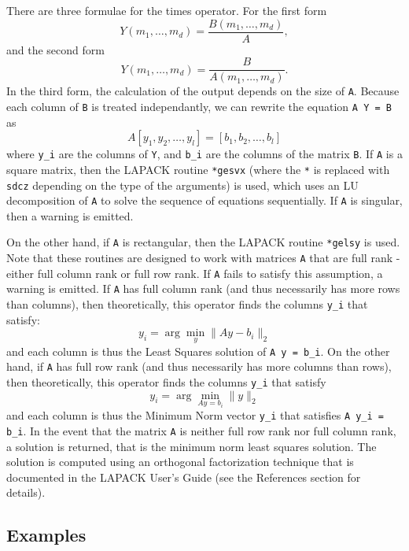 There are three formulae for the times operator.  For the first form
\[
Y(m_1,\ldots,m_d) = \frac{B(m_1,\ldots,m_d)}{A},
\]
and the second form
\[
Y(m_1,\ldots,m_d) = \frac{B}{A(m_1,\ldots,m_d)}.
\]
In the third form, the calculation of the output depends on the size of \verb|A|. Because each column of \verb|B| is treated independantly, we can rewrite the equation \verb|A Y = B| as
\[
  A [y_1, y_2,\ldots, y_l] = [b_1, b_2, \ldots, b_l]
\]
where \verb|y_i| are the columns of \verb|Y|, and \verb|b_i| are the columns of the matrix \verb|B|. If \verb|A| is a square matrix, then the LAPACK routine \verb|*gesvx| (where the \verb|*| is replaced with \verb|sdcz| depending on the type of the arguments) is used, which uses an LU decomposition of \verb|A| to solve the sequence of equations sequentially.  If \verb|A| is singular, then a warning is emitted. 

On the other hand, if \verb|A| is rectangular, then the LAPACK routine \verb|*gelsy| is used.  Note that these routines are designed to work with matrices \verb|A| that are full rank - either full column rank or full row rank.  If \verb|A| fails to satisfy this assumption, a warning is emitted.  If \verb|A| has full column rank (and thus necessarily has more rows than columns), then theoretically, this operator finds the columns \verb|y_i| that satisfy:
\[
  y_i = \arg \min_y \| A y - b_i \|_2
\]
and each column is thus the Least Squares solution of \verb|A y = b_i|.  On the other hand, if \verb|A| has full row rank (and thus necessarily has more columns than rows), then theoretically, this operator finds the columns \verb|y_i| that satisfy
\[
  y_i = \arg \min_{A y = b_i} \| y \|_2
\]
and each column is thus the Minimum Norm vector \verb|y_i| that satisfies \verb|A y_i = b_i|.  
In the event that the matrix \verb|A| is neither full row rank nor full column rank, a solution is returned, that is the minimum norm least squares solution.  The solution is computed using an orthogonal factorization technique that is documented in the LAPACK User's Guide (see the References section for details).
\subsection{Examples}

